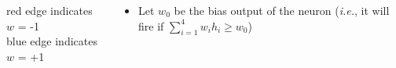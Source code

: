 \begin{frame}
\begin{columns}
\begin{overlayarea}{\textwidth}{\textheight}
			red edge indicates $w$ = -1 \\
			blue edge indicates $w$ = +1


		\end{overlayarea}

		\begin{overlayarea}{\textwidth}{\textheight}

			\begin{itemize}\justifying
				\item Let $w_0$ be the bias output of the neuron (\textit{i.e.}, it will fire if $\sum_{i=1}^{4}w_ih_i \geq w_0$)
			\end{itemize}


\end{overlayarea}
\end{columns}
\end{frame}
